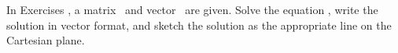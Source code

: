{\noin In Exercises}
{, a matrix \tta\ and vector \vb\ are given. 
Solve the equation \ttaxb, write the solution in vector format, and sketch the solution as the appropriate line on the Cartesian plane.}
